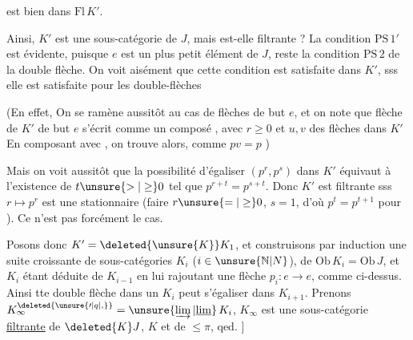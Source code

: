 est  bien dans $\mathrm{Fl}\,K'$.

Ainsi, $K'$ est une sous-catégorie de $J$, mais est-elle filtrante ? La condition $\mathrm{PS}\,1'$ est évidente, puisque $e$ est un plus petit élément de $J$, reste la condition $\mathrm{PS}\,2$ de la double flèche. On voit aisément que cette condition est satisfaite dans $K'$, sss elle est satisfaite pour les double-flèches

(En effet,  On se ramène aussitôt au cas de  flèches de but $e$, et on note que  flèche de $K'$ de but $e$ s'écrit comme un composé
, avec $r\geq0$ et $u,v$
des flèches dans $K'$  En composant
avec , on trouve alors, comme $pv=p$
\unsure{:} )

Mais on voit aussitôt que la possibilité d'égaliser $(p^r,p^s)$ dans $K'$ équivaut à l'existence de $t\unsure{>|\geq}0$ tel que $p^{r+t}=p^{s+t}$. Donc $K'$ est filtrante sss \deleted{\unsure{$\varphi$}} $r\longmapsto p^r$ est une  stationnaire (faire $r\unsure{=|\geq}0$, $s=1$, d'où $p^t=p^{t+1}$ pour ). Ce n'est
pas forcément le cas.


Posons donc  $K'=\deleted{\unsure{K}}K_1$, et construisons par induction une suite croissante de sous-catégories $K_i$ ($i\in\unsure{\mathbb{N}|N}$), de $\mathrm{Ob}\,K_i=\mathrm{Ob}\,J$, et $K_i$  étant déduite de $K_{i-1}$ en lui rajoutant  une flèche $p_i:e\longrightarrow e$, comme ci-dessus. Ainsi tte double flèche dans un $K_i$ peut s'égaliser dans $K_{i+1}$. Prenons $K_{\infty}^{\deleted{\unsure{\prime|q|,}}}=\unsure{\varinjlim|\underline{\lim}}\,K_i$, $K_{\infty}$ est une sous-catégorie \uline{filtrante} de $\deleted{K}J$,  $K$ et de  $\leq\pi$,  qed. $\big]$

